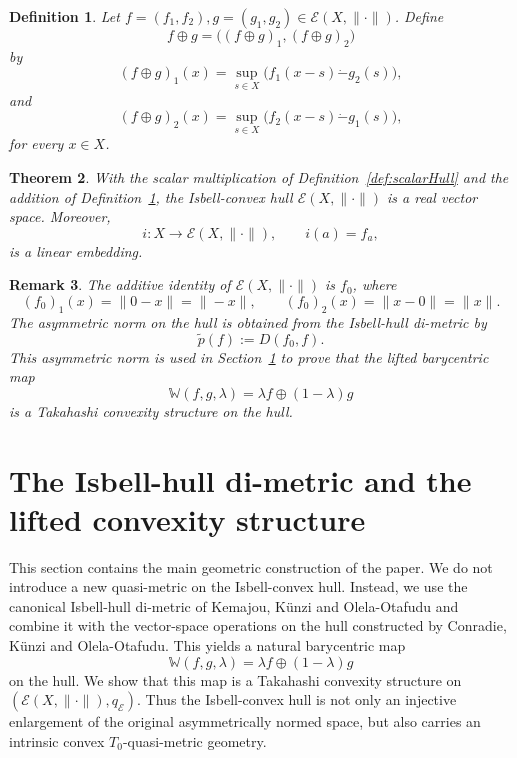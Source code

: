 \documentclass[preprint,12pt]{elsarticle}
\numberwithin{equation}{section}
\newtheorem{theorem}{Theorem}[section]
\newtheorem{definition}[theorem]{Definition}
\newtheorem{remark}[theorem]{Remark}
\newcommand{\E}{\mathcal{E}}
\begin{document}
\begin{definition}\label{def:oplusHull}
Let \(f=(f_1,f_2),g=(g_1,g_2)\in\E(X,\|\cdot\|)\).  Define
\[
f\oplus g=\bigl((f\oplus g)_1,(f\oplus g)_2\bigr)
\]
by
\[
(f\oplus g)_1(x)
=
\sup_{s\in X}
\bigl(f_1(x-s)\dot{-}g_2(s)\bigr),
\]
and
\[
(f\oplus g)_2(x)
=
\sup_{s\in X}
\bigl(f_2(x-s)\dot{-}g_1(s)\bigr),
\]
for every \(x\in X\).
\end{definition}

\begin{theorem}\label{thm:Evectorspace}
With the scalar multiplication of Definition~\ref{def:scalarHull} and the
addition of Definition~\ref{def:oplusHull}, the Isbell-convex hull
\(\E(X,\|\cdot\|)\) is a real vector space.  Moreover,
\[
i:X\longrightarrow \E(X,\|\cdot\|),
\qquad
i(a)=f_a,
\]
is a linear embedding.
\end{theorem}

\begin{remark}\label{rem:additiveidentity}
The additive identity of \(\E(X,\|\cdot\|)\) is \(f_0\), where
\[
(f_0)_1(x)=\|0-x\|=\|-x\|,
\qquad
(f_0)_2(x)=\|x-0\|=\|x\|.
\]
The asymmetric norm on the hull is obtained from the Isbell-hull di-metric by
\[
\widetilde p(f):=D(f_0,f).
\]
This asymmetric norm is used in Section~\ref{sec:hullconvex} to prove that the
lifted barycentric map
\[
\mathbb W(f,g,\lambda)=\lambda f\oplus(1-\lambda)g
\]
is a Takahashi convexity structure on the hull.
\end{remark}




\section{The Isbell-hull di-metric and the lifted convexity structure}
\label{sec:hullconvex}

This section contains the main geometric construction of the paper.  We do
not introduce a new quasi-metric on the Isbell-convex hull.  Instead, we use
the canonical Isbell-hull di-metric of Kemajou, K\"unzi and Olela-Otafudu and
combine it with the vector-space operations on the hull constructed by
Conradie, K\"unzi and Olela-Otafudu.  This yields a natural barycentric map
\[
\mathbb W(f,g,\lambda)=\lambda f\oplus(1-\lambda)g
\]
on the hull.  We show that this map is a Takahashi convexity structure on
\((\E(X,\|\cdot\|),q_{\E})\).  Thus the Isbell-convex hull is not only an
injective enlargement of the original asymmetrically normed space, but also
carries an intrinsic convex \(T_{0}\)-quasi-metric geometry.
\end{document}
